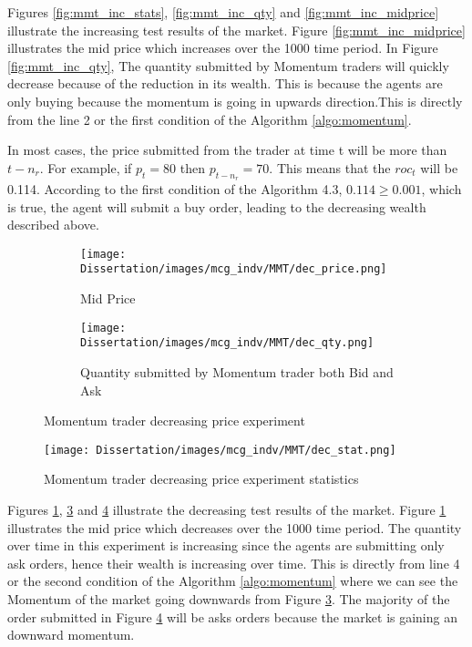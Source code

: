 Figures \ref{fig:mmt_inc_stats}, \ref{fig:mmt_inc_qty} and \ref{fig:mmt_inc_midprice} illustrate the increasing test results of the market. Figure \ref{fig:mmt_inc_midprice} illustrates the mid price which increases over the 1000 time period. In Figure \ref{fig:mmt_inc_qty}, The quantity submitted by Momentum traders will quickly decrease because of the reduction in its wealth. This is because the agents are only buying because the momentum is going in upwards direction.This is directly from the line 2 or the first condition of the Algorithm \ref{algo:momentum}. 

In most cases, the price submitted from the trader at time t will be more than $t-n_r$. For example, if $p_t = 80$ then $p_{t - n_r} = 70$. This means that the $roc_t$ will be 0.114. According to the first condition of the Algorithm 4.3, $0.114 \ge 0.001$, which is true, the agent will submit a buy order, leading to the decreasing wealth described above.  

\begin{figure}[h]
  \begin{subfigure}[b]{0.5\textwidth}
    \texttt{[image: Dissertation/images/mcg\_indv/MMT/dec\_price.png]}
    \caption{Mid Price}
    \label{fig:mmt_dec_midprice}
  \end{subfigure}
  \begin{subfigure}[b]{0.5\textwidth}
    \texttt{[image: Dissertation/images/mcg\_indv/MMT/dec\_qty.png]}
    \caption{Quantity submitted by Momentum trader both Bid and Ask}
    \label{fig:mmt_dec_qty}
  \end{subfigure}
\caption{Momentum trader decreasing price experiment} 
\end{figure}


\begin{figure}[h]
\texttt{[image: Dissertation/images/mcg\_indv/MMT/dec\_stat.png]}
\caption{Momentum trader decreasing price experiment statistics} 
\label{fig:mmt_dec_stats}
\end{figure} 
\FloatBarrier

Figures \ref{fig:mmt_dec_midprice}, \ref{fig:mmt_dec_qty}  and \ref{fig:mmt_dec_stats} illustrate the decreasing test results of the market. Figure \ref{fig:mmt_dec_midprice} illustrates the mid price which decreases over the 1000 time period. The quantity over time in this experiment is increasing since the agents are submitting only ask orders, hence their wealth is increasing over time. This is directly from line 4 or the second condition of the Algorithm \ref{algo:momentum} where we can see the Momentum of the market going downwards from Figure \ref{fig:mmt_dec_qty}. The majority of the order submitted in Figure \ref{fig:mmt_dec_stats} will be asks orders because the market is gaining an downward momentum. 

